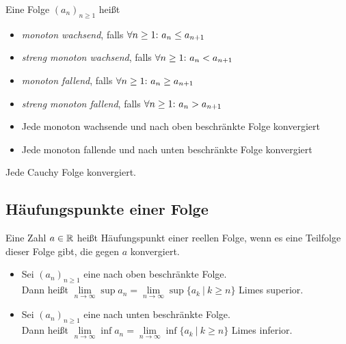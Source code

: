 \begin{frameddefn}
	Eine Folge $(a_n)_{n\geq 1}$ heißt
	\begin{itemize}
		\item \textit{monoton wachsend}, falls $\forall n \geq 1{:}\  a_n \leq a_{n+1}$
		\item \textit{streng monoton wachsend}, falls $\forall n \geq 1{:}\  a_n < a_{n+1}$
		\item \textit{monoton fallend}, falls $\forall n \geq 1{:}\  a_n \geq a_{n+1}$
		\item \textit{streng monoton fallend}, falls $\forall n \geq 1{:}\  a_n > a_{n+1}$
	\end{itemize}
\end{frameddefn}


\begin{framedthm}
	\begin{itemize}
		\item Jede monoton wachsende und nach oben beschränkte Folge konvergiert
		\item Jede monoton fallende und nach unten beschränkte Folge konvergiert
	\end{itemize}
\end{framedthm}


\begin{framedthm}
	Jede Cauchy Folge konvergiert.
\end{framedthm}


\subsection{Häufungspunkte einer Folge}

\begin{frameddefn}[Häufungspunkt]
	Eine Zahl $a \in \mathbb{R}$ heißt Häufungspunkt einer reellen Folge, wenn es eine Teilfolge dieser Folge gibt, die gegen $a$ konvergiert.
\end{frameddefn}


\begin{frameddefn}
	\begin{itemize}
		\item Sei $(a_n)_{n\geq 1}$ eine nach oben beschränkte Folge.\\ Dann heißt $\lim\limits_{n \to \infty} \sup a_n = \lim\limits_{n \to \infty} \sup \{a_k \ |\ k\geq n\}$ Limes superior.
		\item Sei $(a_n)_{n\geq 1}$ eine nach unten beschränkte Folge.\\ Dann heißt $\lim\limits_{n \to \infty} \inf a_n = \lim\limits_{n \to \infty} \inf \{a_k \ |\ k\geq n\}$ Limes inferior.
	\end{itemize}
	
\end{frameddefn}

